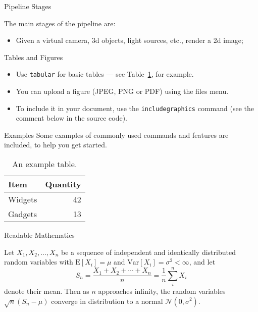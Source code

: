 \documentclass{beamer}
\begin{document}
\begin{frame}{Pipeline Stages}

	The main stages of the pipeline are:

	\begin{itemize}
		\item Given a virtual camera, 3d objects, light sources, etc., render a 2d image;
	\end{itemize}

	\vskip 1cm


\end{frame}



\begin{frame}{Tables and Figures}

\begin{itemize}
\item Use \texttt{tabular} for basic tables --- see Table~\ref{tab:widgets}, for example.
\item You can upload a figure (JPEG, PNG or PDF) using the files menu.
\item To include it in your document, use the \texttt{includegraphics} command (see the comment below in the source code).
\end{itemize}

\begin{block}{Examples}
	Some examples of commonly used commands and features are included, to help you get started.
\end{block}


\begin{table}
\centering
\begin{tabular}{l|r}
Item & Quantity \\\hline
Widgets & 42 \\
Gadgets & 13
\end{tabular}
\caption{\label{tab:widgets}An example table.}
\end{table}

\end{frame}

\begin{frame}{Readable Mathematics}

Let $X_1, X_2, \ldots, X_n$ be a sequence of independent and identically distributed random variables with $\text{E}[X_i] = \mu$ and $\text{Var}[X_i] = \sigma^2 < \infty$, and let
\[ S_n = \frac{X_1 + X_2 + \cdots + X_n}{n}
      = \frac{1}{n}\sum_{i}^{n} X_i \]
denote their mean. Then as $n$ approaches infinity, the random variables $\sqrt{n}(S_n - \mu)$ converge in distribution to a normal $\mathcal{N}(0, \sigma^2)$.

\end{frame}
\end{document}

